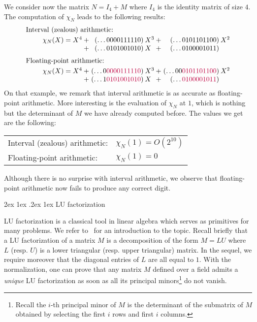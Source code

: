 \documentclass[11pt]{article}
\makeatletter
\numberwithin{equation}{section}
\numberwithin{figure}{section}
\renewcommand\paragraph{\@startsection{paragraph}{4}{\z@}%
                                    {2ex \@plus1ex \@minus.2ex}%
                                    {1ex}%
                                    {\normalfont\normalsize\bfseries}}
\theoremstyle{definition}
\makeatother
\begin{document}
We consider now the matrix $N = I_4 + M$ where $I_4$ is the identity
matrix of size $4$.
The computation of $\chi_N$ leads to the following results:
$$\begin{array}{cr@{\hspace{0.2ex}}r@{\hspace{0.5ex}}l@{\hspace{0.2ex}}r@{\hspace{0.5ex}}l}
\multicolumn{6}{l}{\text{Interval (zealous) arithmetic:}}\smallskip\\
\hspace{5mm}\null
& \chi_N(X) = X^4 + {}& (\ldots 0000111110) & X^3 
      + {}& (\ldots 0101101100) & X^2 \\
  & {}+ {}& (\ldots 0101001010) & X^{\phantom{1}} 
      + {}& (\ldots 0100001011) \medskip \\
\multicolumn{6}{l}{\text{Floating-point arithmetic:}}\smallskip\\
& \chi_N(X) = X^4 + {}& (\ldots0{\color{purple}0000111110}) & X^3 
      + {}& (\ldots00{\color{purple}0101101100}) & X^2 \\
  & {}+ {}& (\ldots1{\color{purple}0101001010}) & X^{\phantom{1}} 
      + {}& (\ldots {\color{purple}0100001011}) \\
\end{array}$$
On that example, we remark that interval arithmetic is as accurate
as floating-point arithmetic.
More interesting is the evaluation of $\chi_N$ at $1$, which is 
nothing but the determinant of $M$ we have already computed before.
The values we get are the following:
\begin{center}
\begin{tabular}{ll}
Interval (zealous) arithmetic: & $\chi_N(1) = O(2^{10})$ \smallskip \\
Floating-point arithmetic: & $\chi_N(1) = 0$
\end{tabular}
\end{center}
Although there is no surprise with interval arithmetic, we observe
that floating-point arithmetic now fails to produce any correct digit.

\paragraph{LU factorization}

LU factorization is a classical tool in linear algebra which serves
as primitives for many problems.
We refer to~\cite[\S 2]{AbLo04} for an introduction to the topic. 
Recall briefly that a LU factorization of a matrix $M$ is a 
decomposition of the form $M = LU$ where $L$ (resp. $U$) is a lower triangular 
(resp. upper triangular) matrix. In the sequel, we require moreover that 
the diagonal entries of $L$ are all equal to $1$.
With the normalization, one can prove that any matrix $M$ defined over a 
field admits a \emph{unique} LU factorization as soon as all its principal 
minors\footnote{Recall the $i$-th principal minor of $M$ is the 
determinant of the submatrix of $M$ obtained by selecting the first $i$
rows and first $i$ columns.} do not vanish. 
\end{document}
